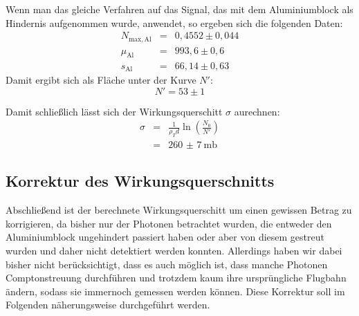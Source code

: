 Wenn man das gleiche Verfahren auf das Signal, das mit dem Aluminiumblock als
Hindernis aufgenommen wurde, anwendet, so ergeben sich die folgenden Daten:
\begin{eqnarray}
N_{\mathrm{max, Al}} &=& 0,4552 \pm 0,044\\
\mu_{\mathrm{Al}} &=& 993,6 \pm 0,6\\
s_{\mathrm{Al}} &=& 66,14 \pm 0,63
\end{eqnarray}
Damit ergibt sich als Fläche unter der Kurve $N'$:
\begin{equation}
N' = 53 \pm 1
\end{equation}

Damit schließlich lässt sich der Wirkungsquerschitt $\sigma$ aurechnen:
\begin{eqnarray}
\sigma &=& \frac{1}{\rho_T d}\ln\left(\frac{N_0}{N'}\right)\\
\nonumber &=& \SI{260(7)}{\milli\barn}
\end{eqnarray}


\subsection{Korrektur des Wirkungsquerschnitts}
Abschließend ist der berechnete Wirkungsquerschitt um einen gewissen Betrag zu
korrigieren, da bisher nur der Photonen betrachtet wurden, die entweder den
Aluminiumblock ungehindert passiert haben oder aber von diesem gestreut wurden
und daher nicht detektiert werden konnten. Allerdings haben wir dabei bisher
nicht berücksichtigt, dass es auch möglich ist, dass manche Photonen
Comptonstreuung durchführen und trotzdem kaum ihre ursprüngliche Flugbahn
ändern, sodass sie immernoch gemessen werden können. Diese Korrektur soll im
Folgenden näherungsweise durchgeführt werden.

